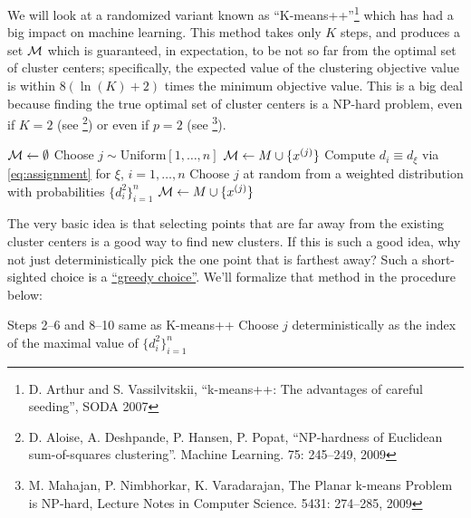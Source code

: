 \documentclass[10pt, letterpaper]{scrartcl}
\begin{document}
We will look at a randomized variant known as ``K-means++''\footnote{D. Arthur and S. Vassilvitskii, ``k-means++: The advantages of careful seeding'', SODA 2007} which has had a big impact on machine learning. This method takes only $K$ steps, and produces a set $\mathcal{M}$ which is guaranteed, in expectation, to be not so far from the optimal set of cluster centers; specifically, the expected value of the clustering objective value is within $8(\ln(K)+2)$ times the minimum objective value. This is a big deal because finding the true optimal set of cluster centers is a NP-hard problem, even if $K=2$ (see \footnote{D. Aloise, A. Deshpande, P. Hansen, P. Popat, ``NP-hardness of Euclidean sum-of-squares clustering''. Machine Learning. 75: 245–249, 2009 }) or even if $p=2$ (see \footnote{M. Mahajan, P. Nimbhorkar, K. Varadarajan, The Planar k-means Problem is NP-hard, Lecture Notes in Computer Science. 5431: 274–285, 2009}).

\begin{algorithm}
    \begin{algorithmic}[1]
          
        \State $\mathcal{M} \gets \emptyset$ 
        \State Choose $j \sim \text{Uniform}[1,\ldots,n]$
        \State $\mathcal{M} \gets M \cup \{ x^{(j)} \}$
        \State Compute $d_i \equiv d_{\xi}$ via \eqref{eq:assignment} for $\xi$, $i=1,\ldots,n$ 
        \State Choose $j$ at random from a weighted distribution with probabilities $\{d_i^2\}_{i=1}^n$
        \State $\mathcal{M} \gets M \cup \{ x^{(j)} \}$
        \EndFor
        \EndProcedure
    \end{algorithmic}
\end{algorithm}

The very basic idea is that selecting points that are far away from the existing cluster centers is a good way to find new clusters. If this is such a good idea, why not just deterministically pick the one point that is farthest away? Such a short-sighted choice is a \href{https://en.wikipedia.org/wiki/Greedy_algorithm}{``greedy choice''}. We'll formalize that method in the procedure below:

\begin{algorithm}
\begin{algorithmic}[1]
         \Statex Steps 2--6 and 8--10 same as K-means++ 
    \makeatletter
    \setcounter{ALG@line}{6}
    \makeatother
       \State  \hspace{9.5mm} Choose $j$ deterministically as the index of the maximal value of $\{d_i^2\}_{i=1}^n$
    \makeatletter
\setcounter{ALG@line}{9}
\makeatother
   \EndProcedure
\end{algorithmic}
\end{algorithm}
\end{document}
